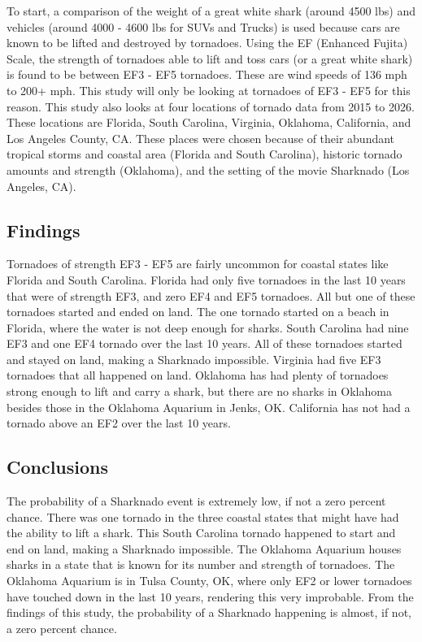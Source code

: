 \documentclass[
  letterpaper,
  DIV=11,
  numbers=noendperiod]{scrreprt}
\begin{document}
To start, a comparison of the weight of a great white shark (around 4500
lbs) and vehicles (around 4000 - 4600 lbs for SUVs and Trucks) is used
because cars are known to be lifted and destroyed by tornadoes. Using
the EF (Enhanced Fujita) Scale, the strength of tornadoes able to lift
and toss cars (or a great white shark) is found to be between EF3 - EF5
tornadoes. These are wind speeds of 136 mph to 200+ mph. This study will
only be looking at tornadoes of EF3 - EF5 for this reason. This study
also looks at four locations of tornado data from 2015 to 2026. These
locations are Florida, South Carolina, Virginia, Oklahoma, California,
and Los Angeles County, CA. These places were chosen because of their
abundant tropical storms and coastal area (Florida and South Carolina),
historic tornado amounts and strength (Oklahoma), and the setting of the
movie Sharknado (Los Angeles, CA).

\subsection{Findings}\label{findings-1}

Tornadoes of strength EF3 - EF5 are fairly uncommon for coastal states
like Florida and South Carolina. Florida had only five tornadoes in the
last 10 years that were of strength EF3, and zero EF4 and EF5 tornadoes.
All but one of these tornadoes started and ended on land. The one
tornado started on a beach in Florida, where the water is not deep
enough for sharks. South Carolina had nine EF3 and one EF4 tornado over
the last 10 years. All of these tornadoes started and stayed on land,
making a Sharknado impossible. Virginia had five EF3 tornadoes that all
happened on land. Oklahoma has had plenty of tornadoes strong enough to
lift and carry a shark, but there are no sharks in Oklahoma besides
those in the Oklahoma Aquarium in Jenks, OK. California has not had a
tornado above an EF2 over the last 10 years.

\subsection{Conclusions}\label{conclusions-1}

The probability of a Sharknado event is extremely low, if not a zero
percent chance. There was one tornado in the three coastal states that
might have had the ability to lift a shark. This South Carolina tornado
happened to start and end on land, making a Sharknado impossible. The
Oklahoma Aquarium houses sharks in a state that is known for its number
and strength of tornadoes. The Oklahoma Aquarium is in Tulsa County, OK,
where only EF2 or lower tornadoes have touched down in the last 10
years, rendering this very improbable. From the findings of this study,
the probability of a Sharknado happening is almost, if not, a zero
percent chance.
\end{document}
